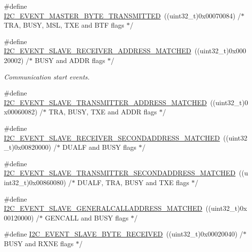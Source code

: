 \begin{DoxyCompactItemize}
\item 
\#define \hyperlink{group___i2_c___events_ga8fe3b96b54e3c38e1de5d48536039c8f}{I2\+C\+\_\+\+E\+V\+E\+N\+T\+\_\+\+M\+A\+S\+T\+E\+R\+\_\+\+B\+Y\+T\+E\+\_\+\+T\+R\+A\+N\+S\+M\+I\+T\+T\+ED}~((uint32\+\_\+t)0x00070084)  /$\ast$ T\+R\+A, B\+U\+S\+Y, M\+S\+L, T\+X\+E and B\+T\+F flags $\ast$/
\item 
\#define \hyperlink{group___i2_c___events_ga6cf0e334704618b024eee604849f50f7}{I2\+C\+\_\+\+E\+V\+E\+N\+T\+\_\+\+S\+L\+A\+V\+E\+\_\+\+R\+E\+C\+E\+I\+V\+E\+R\+\_\+\+A\+D\+D\+R\+E\+S\+S\+\_\+\+M\+A\+T\+C\+H\+ED}~((uint32\+\_\+t)0x00020002) /$\ast$ B\+U\+S\+Y and A\+D\+D\+R flags $\ast$/
\begin{DoxyCompactList}\small\item\em Communication start events. \end{DoxyCompactList}\item 
\#define \hyperlink{group___i2_c___events_ga3fa381c1fd9a95c8ae13c6cc402b1327}{I2\+C\+\_\+\+E\+V\+E\+N\+T\+\_\+\+S\+L\+A\+V\+E\+\_\+\+T\+R\+A\+N\+S\+M\+I\+T\+T\+E\+R\+\_\+\+A\+D\+D\+R\+E\+S\+S\+\_\+\+M\+A\+T\+C\+H\+ED}~((uint32\+\_\+t)0x00060082) /$\ast$ T\+R\+A, B\+U\+S\+Y, T\+X\+E and A\+D\+D\+R flags $\ast$/
\item 
\#define \hyperlink{group___i2_c___events_ga17e78ab01fa980b3df10f8d9f6864c48}{I2\+C\+\_\+\+E\+V\+E\+N\+T\+\_\+\+S\+L\+A\+V\+E\+\_\+\+R\+E\+C\+E\+I\+V\+E\+R\+\_\+\+S\+E\+C\+O\+N\+D\+A\+D\+D\+R\+E\+S\+S\+\_\+\+M\+A\+T\+C\+H\+ED}~((uint32\+\_\+t)0x00820000)  /$\ast$ D\+U\+A\+L\+F and B\+U\+S\+Y flags $\ast$/
\item 
\#define \hyperlink{group___i2_c___events_ga6221aa204356bec9146f800ccfc99fc1}{I2\+C\+\_\+\+E\+V\+E\+N\+T\+\_\+\+S\+L\+A\+V\+E\+\_\+\+T\+R\+A\+N\+S\+M\+I\+T\+T\+E\+R\+\_\+\+S\+E\+C\+O\+N\+D\+A\+D\+D\+R\+E\+S\+S\+\_\+\+M\+A\+T\+C\+H\+ED}~((uint32\+\_\+t)0x00860080)  /$\ast$ D\+U\+A\+L\+F, T\+R\+A, B\+U\+S\+Y and T\+X\+E flags $\ast$/
\item 
\#define \hyperlink{group___i2_c___events_ga15195f6def95f688ae9725899f49ea23}{I2\+C\+\_\+\+E\+V\+E\+N\+T\+\_\+\+S\+L\+A\+V\+E\+\_\+\+G\+E\+N\+E\+R\+A\+L\+C\+A\+L\+L\+A\+D\+D\+R\+E\+S\+S\+\_\+\+M\+A\+T\+C\+H\+ED}~((uint32\+\_\+t)0x00120000)  /$\ast$ G\+E\+N\+C\+A\+L\+L and B\+U\+S\+Y flags $\ast$/
\item 
\#define \hyperlink{group___i2_c___events_ga8b244626839940569c6c8bbfc4efe21d}{I2\+C\+\_\+\+E\+V\+E\+N\+T\+\_\+\+S\+L\+A\+V\+E\+\_\+\+B\+Y\+T\+E\+\_\+\+R\+E\+C\+E\+I\+V\+ED}~((uint32\+\_\+t)0x00020040)  /$\ast$ B\+U\+S\+Y and R\+X\+N\+E flags $\ast$/

\end{DoxyCompactItemize}
